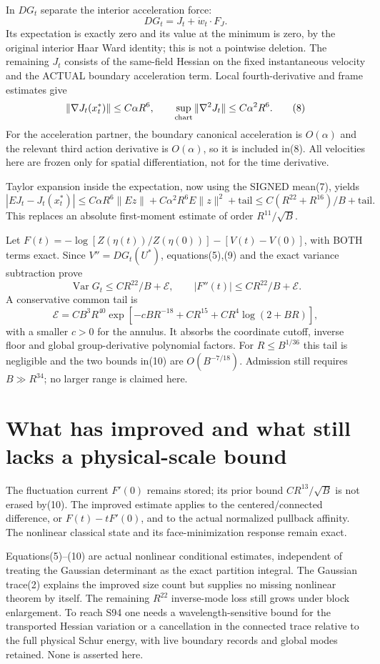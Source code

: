 \documentclass{article}
\begin{document}
In $DG_t$ separate the interior acceleration force:
\[
 DG_t=J_t+\dot w_t\cdot F_J.
\]
Its expectation is exactly zero and its value at the minimum is zero, by the original interior Haar Ward identity; this is not a pointwise deletion.
The remaining $J_t$ consists of the same-field Hessian on the fixed instantaneous velocity and the ACTUAL boundary acceleration term. Local fourth-derivative and frame estimates give
\[
 \|\nabla J_t(x_t^*)\|\le C\alpha R^6,\qquad
 \sup_{\rm chart}\|\nabla^2J_t\|\le C\alpha^2R^6.       \tag{8}
\]
For the acceleration partner, the boundary canonical acceleration is $O(\alpha)$ and the relevant third action derivative is $O(\alpha)$, so it is included in(8). All velocities here are frozen only for spatial differentiation, not for the time derivative.

Taylor expansion inside the expectation, now using the SIGNED mean(7), yields
\[
 |EJ_t-J_t(x_t^*)|
 \le C\alpha R^6\|Ez\|+
           C\alpha^2R^6E\|z\|^2+\text{tail}
 \le C(R^{22}+R^{16})/B+\text{tail}.                  \tag{9}
\]
This replaces an absolute first-moment estimate of order $R^{11}/\sqrt B$.

Let $F(t)=-\log[Z(\eta(t))/Z(\eta(0))]-[V(t)-V(0)]$, with BOTH terms exact. Since $V''=DG_t(U^*)$, equations(5),(9) and the exact variance subtraction prove
\[
 \boxed{\quad \operatorname{Var}G_t\le CR^{22}/B+\mathcal E,\qquad
                  |F''(t)|\le CR^{22}/B+\mathcal E.\quad}             \tag{10}
\]
A conservative common tail is
\[
 \mathcal E=C B^3R^{40}
   \exp[-cBR^{-18}+CR^{15}+CR^4\log(2+BR)],
\]
with a smaller $c>0$ for the annulus. It absorbs the coordinate cutoff, inverse floor and global group-derivative polynomial factors. For $R\le B^{1/36}$ this tail is negligible and the two bounds in(10) are $O(B^{-7/18})$. Admission still requires $B\gg R^{34}$; no larger range is claimed here.

\section*{What has improved and what still lacks a physical-scale bound}
The fluctuation current $F'(0)$ remains stored; its prior bound $CR^{13}/\sqrt B$ is not erased by(10). The improved estimate applies to the centered/connected difference, or $F(t)-tF'(0)$, and to the actual normalized pullback affinity. The nonlinear classical state and its face-minimization response remain exact.

Equations(5)--(10) are actual nonlinear conditional estimates, independent of treating the Gaussian determinant as the exact partition integral. The Gaussian trace(2) explains the improved size count but supplies no missing nonlinear theorem by itself. The remaining $R^{22}$ inverse-mode loss still grows under block enlargement. To reach S94 one needs a wavelength-sensitive bound for the transported Hessian variation or a cancellation in the connected trace relative to the full physical Schur energy, with live boundary records and global modes retained. None is asserted here.
\end{document}
